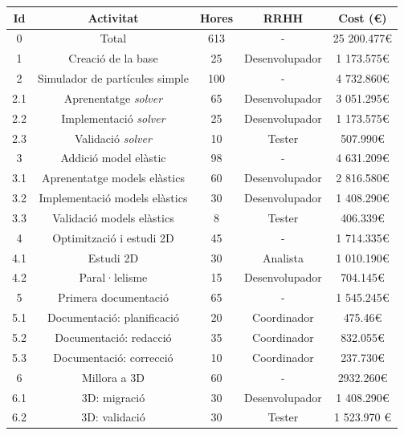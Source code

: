 \documentclass[a4paper]{article} %
\begin{document}
	\begin{table}[h!]
		\centering
		\begin{tabular}{|| c | c || c | c | c ||}
			\hline
			\textbf{Id} & \textbf{Activitat} & \textbf{Hores} & \textbf{RRHH} & \textbf{Cost (\euro)} \\
			\hline
			0 & Total & 613 & - & 25 200.477\euro \\ %
			\hline \hline
			1 & Creació de la base & 25 & Desenvolupador & 1 173.575\euro \\
			\hline \hline
			2 & Simulador de partícules simple & 100 & - & 4 732.860\euro\\
			\hline
			2.1 & Aprenentatge \textit{solver} & 65 & Desenvolupador &  3 051.295\euro \\
			2.2 & Implementació \textit{solver} & 25 & Desenvolupador & 1 173.575\euro \\
			2.3 & Validació \textit{solver} & 10 & Tester & 507.990\euro \\
			\hline \hline
			3 & Addició model elàstic & 98 & - & 4 631.209\euro \\
			\hline
			3.1 & Aprenentatge models elàstics & 60 & Desenvolupador & 2 816.580\euro \\
			3.2 & Implementació models elàstics & 30 & Desenvolupador & 1 408.290\euro \\
			3.3 & Validació models elàstics & 8 & Tester & 406.339\euro \\
			\hline \hline
			4 & Optimització i estudi 2D & 45 & - & 1 714.335\euro \\
			\hline
			4.1 & Estudi 2D & 30 & Analista & 1 010.190\euro \\ 
			4.2 & Paral·lelisme & 15 & Desenvolupador & 704.145\euro \\
			\hline \hline
			5 & Primera documentació & 65 & - & 1 545.245\euro \\ 
			\hline
			5.1 & Documentació: planificació & 20 & Coordinador & 475.46\euro \\ 
			5.2 & Documentació: redacció & 35 & Coordinador & 832.055\euro \\
			5.3 & Documentació: correcció & 10 & Coordinador & 237.730\euro \\
			\hline \hline
			6 & Millora a 3D & 60 & -& 2932.260\euro \\
			\hline
			6.1 & 3D: migració & 30 & Desenvolupador & 1 408.290\euro \\
			6.2 & 3D: validació & 30 & Tester & 1 523.970 \euro \\
			\hline \hline

\end{tabular}
\end{table}
\end{document}
